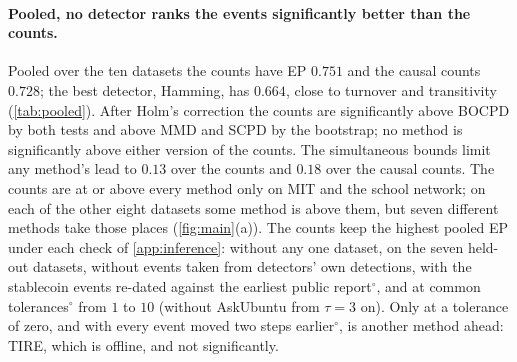 \documentclass[11pt]{article}
\theoremstyle{dsplain}
\theoremstyle{definition}
\begin{document}
\paragraph{Pooled, no detector ranks the events significantly better than the counts.} Pooled over the
ten datasets the counts
have EP $0.751$ and the causal counts $0.728$; the best detector, Hamming, has $0.664$, close to turnover and
transitivity (\cref{tab:pooled}). After Holm's correction the counts are significantly above BOCPD by both
tests and above MMD and SCPD by the bootstrap; no method is significantly above either version of the counts. The simultaneous
bounds limit any method's lead to $0.13$ over the counts and $0.18$ over the causal counts. The counts are at or
above every method only on MIT and the school network; on each of the other eight datasets some method is
above them, but seven different methods take those places
(\cref{fig:main}(a)). The counts keep the highest pooled EP under each check of \cref{app:inference}: without any one dataset, on
the seven held-out datasets, without events taken from detectors' own detections, with the stablecoin events
re-dated against the earliest public report$^\circ$, and at common tolerances$^\circ$ from $1$ to $10$ (without AskUbuntu from $\tau = 3$ on). Only at a tolerance of zero, and with every event moved two steps
earlier$^\circ$, is another method ahead: TIRE, which is offline, and not significantly.
\end{document}
